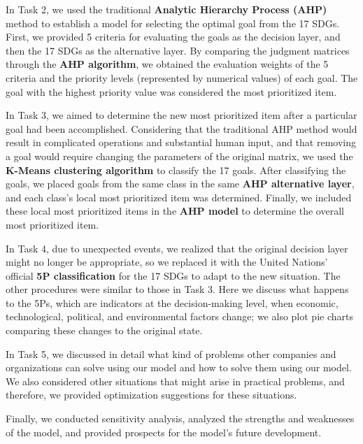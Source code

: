 \documentclass[12pt]{article}
\begin{document}
In Task 2, we used the traditional \textbf{Analytic Hierarchy Process (AHP)} method to establish a model for selecting the optimal goal from the 17 SDGs. First, we provided 5 criteria for evaluating the goals as the decision layer, and then the 17 SDGs as the alternative layer. By comparing the judgment matrices through the \textbf{AHP algorithm}, we obtained the evaluation weights of the 5 criteria and the priority levels (represented by numerical values) of each goal. The goal with the highest priority value was considered the most prioritized item.

In Task 3, we aimed to determine the new most prioritized item after a particular goal had been accomplished. Considering that the traditional AHP method would result in complicated operations and substantial human input, and that removing a goal would require changing the parameters of the original matrix, we used the \textbf{K-Means clustering algorithm} to classify the 17 goals. After classifying the goals, we placed goals from the same class in the same\textbf{ AHP alternative layer}, and each class's local most prioritized item was determined. Finally, we included these local most prioritized items in the\textbf{ AHP model }to determine the overall most prioritized item.

In Task 4, due to unexpected events, we realized that the original decision layer might no longer be appropriate, so we replaced it with the United Nations' official \textbf{5P classification} for the 17 SDGs to adapt to the new situation. The other procedures were similar to those in Task 3. Here we discuss what happens to the 5Ps, which are indicators at the decision-making level, when economic, technological, political, and environmental factors change; we also plot pie charts comparing these changes to the original state.

In Task 5, we discussed in detail what kind of problems other companies and organizations can solve using our model and how to solve them using our model. We also considered other situations that might arise in practical problems, and therefore, we provided optimization suggestions for these situations.

Finally, we conducted sensitivity analysis, analyzed the strengths and weaknesses of the model, and provided prospects for the model's future development.
\end{document}
